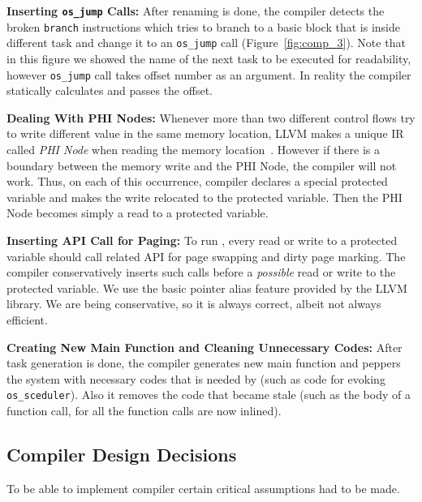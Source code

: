 \textbf{Inserting \texttt{os\_jump} Calls:} After renaming is done, the compiler detects the broken {\tt branch} instructions which tries to branch to a basic block that is inside different task and change it to an {\tt os\_jump} call (Figure~\ref{fig:comp_3}).  Note that in this figure we showed the name of the next task to be executed for readability, however {\tt os\_jump} call takes offset number as an argument. In reality the compiler statically calculates and passes the offset.

\textbf{Dealing With PHI Nodes:} Whenever more than two different control flows try to write different value in the same memory location, LLVM makes a unique IR called {\em PHI Node} when reading the memory location~\cite{}. However if there is a boundary between the memory write and the PHI Node, the compiler will not work. Thus, on each of this occurrence, \sys compiler declares a special protected variable and makes the write relocated to the protected variable. Then the PHI Node becomes simply a read to a protected variable.

\textbf{Inserting API Call for Paging:} To run \sys, every read or write to a protected variable should call related API for page swapping and dirty page marking. The compiler conservatively inserts such calls before a {\em possible} read or write to the protected variable. We use the basic pointer alias feature provided by the LLVM library. We are being conservative, so it is always correct, albeit not always efficient.

\textbf{Creating New Main Function and Cleaning Unnecessary Codes:} After task generation is done, the compiler generates new main function and peppers the system with necessary codes that is needed by \sys (such as code for evoking {\tt os\_sceduler}). Also it removes the code that became stale (such as the body of a function call, for all the function calls are now inlined).

\subsection{Compiler Design Decisions}
\label{sec:compiler_limitations}

To be able to implement \sys compiler certain critical assumptions had to be made. 

